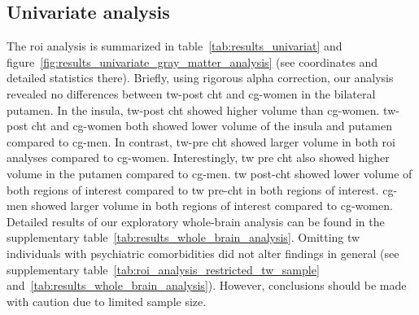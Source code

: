 \documentclass{article}
\begin{document}
    \subsection{Univariate analysis}
    The \acl{roi} analysis is summarized in table~\ref{tab:results_univariat} and figure~\ref{fig:results_univariate_gray_matter_analysis} (see coordinates and detailed statistics there). Briefly, using rigorous alpha correction, our analysis revealed no differences between \ac{tw}-post \ac{cht} and \ac{cg}-women in the bilateral putamen. In the insula, \ac{tw}-post \ac{cht} showed higher volume than \ac{cg}-women. \ac{tw}-post \ac{cht} and \ac{cg}-women both showed lower volume of the insula and putamen compared to \ac{cg}-men.
    In contrast, \ac{tw}-pre \ac{cht} showed larger volume in both \ac{roi} analyses compared to \ac{cg}-women. Interestingly, \ac{tw} pre \ac{cht} also showed higher volume in the putamen compared to \ac{cg}-men.
    \ac{tw} post-\ac{cht} showed lower volume of both regions of interest compared to \ac{tw} pre-\ac{cht} in both regions of interest. \ac{cg}-men showed larger volume in both regions of interest compared to \ac{cg}-women.
    Detailed results of our exploratory whole-brain analysis can be found in the supplementary table~\ref{tab:results_whole_brain_analysis}. Omitting \ac{tw} individuals with psychiatric comorbidities did not alter findings in general (see supplementary table~\ref{tab:roi_analysis_restricted_tw_sample} and~\ref{tab:results_whole_brain_analysis}). However, conclusions should be made with caution due to limited sample size.
\end{document}
